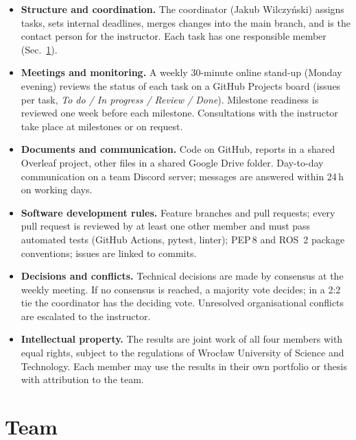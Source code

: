 \documentclass[11pt,a4paper]{article}
\newcommand{\PA}{Jakub Wilczyński}   %
\begin{document}
\begin{itemize}[leftmargin=*]
  \item \textbf{Structure and coordination.} The coordinator (\PA) assigns
        tasks, sets internal deadlines, merges changes into the main branch,
        and is the contact person for the instructor. Each task has one
        responsible member (Sec.~\ref{sec:team}).
  \item \textbf{Meetings and monitoring.} A weekly 30-minute online stand-up
        (Monday evening) reviews the status of each task on a GitHub Projects
        board (issues per task, \emph{To do / In progress / Review / Done}).
        Milestone readiness is reviewed one week before each milestone.
        Consultations with the instructor take place at milestones or on
        request.
  \item \textbf{Documents and communication.} Code on GitHub, reports in a
        shared Overleaf project, other files in a shared Google Drive folder.
        Day-to-day communication on a team Discord server; messages are
        answered within 24\,h on working days.
  \item \textbf{Software development rules.} Feature branches and pull
        requests; every pull request is reviewed by at least one other member
        and must pass automated tests (GitHub Actions, pytest, linter);
        PEP\,8 and ROS~2 package conventions; issues are linked to commits.
  \item \textbf{Decisions and conflicts.} Technical decisions are made by
        consensus at the weekly meeting. If no consensus is reached, a
        majority vote decides; in a 2:2 tie the coordinator has the deciding
        vote. Unresolved organisational conflicts are escalated to the
        instructor.
  \item \textbf{Intellectual property.} The results are joint work of all
        four members with equal rights, subject to the regulations of
        Wrocław University of Science and Technology. Each member may use the
        results in their own portfolio or thesis with attribution to the team.
\end{itemize}


\section{Team}\label{sec:team}
\end{document}
